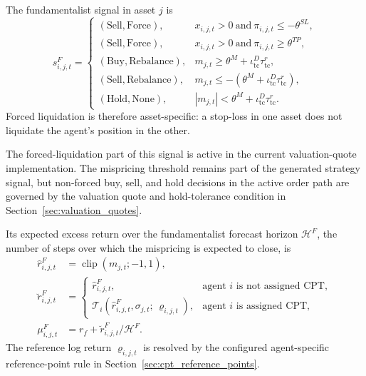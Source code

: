 \documentclass[12pt, a4paper]{article}
\DeclareMathOperator{\clip}{clip}
\begin{document}
    The fundamentalist signal in asset \(j\) is
    \[
        s_{i,j,t}^{F}=
        \begin{cases}
            (\mathrm{Sell},\mathrm{Force}), & x_{i,j,t}>0\ \text{and}\ \pi_{i,j,t}\le -\theta^{SL},\\
        (\mathrm{Sell},\mathrm{Force}), & x_{i,j,t}>0\ \text{and}\ \pi_{i,j,t}\ge \theta^{TP},\\
        (\mathrm{Buy},\mathrm{Rebalance}), & m_{j,t}\ge \theta^{M}+\iota_{\mathrm{tc}}^D\tau_{\mathrm{tc}}^{r},\\
        (\mathrm{Sell},\mathrm{Rebalance}), & m_{j,t}\le -\left(\theta^{M}+\iota_{\mathrm{tc}}^D\tau_{\mathrm{tc}}^{r}\right),\\
        (\mathrm{Hold},\mathrm{None}), & |m_{j,t}|<\theta^{M}+\iota_{\mathrm{tc}}^D\tau_{\mathrm{tc}}^{r}.
        \end{cases}
    \]
    Forced liquidation is therefore asset-specific: a stop-loss in one asset does
    not liquidate the agent's position in the other.

    The forced-liquidation part of this signal is active in the current
    valuation-quote implementation. The mispricing threshold remains part of the
    generated strategy signal, but non-forced buy, sell, and hold decisions in the
    active order path are governed by the valuation quote and hold-tolerance
    condition in Section~\ref{sec:valuation_quotes}.

    Its expected excess return over the fundamentalist forecast horizon
    \(\mathcal H^F\), the number of steps over which the mispricing is expected
    to close, is
    \begin{align*}
        \hat r_{i,j,t}^{F}&=\clip(m_{j,t};-1,1),\\
        \breve r_{i,j,t}^{F}&=
        \begin{cases}
            \hat r_{i,j,t}^{F}, & \text{agent } i \text{ is not assigned CPT},\\
            \mathcal{T}_i\!\left(\hat r_{i,j,t}^{F},\sigma_{j,t};\,\varrho_{i,j,t}\right), & \text{agent } i \text{ is assigned CPT},
        \end{cases}
        \\
        \mu_{i,j,t}^{F}&=r_f+\breve r_{i,j,t}^{F}/\mathcal H^{F}.
    \end{align*}
    The reference log return \(\varrho_{i,j,t}\) is resolved by the configured
    agent-specific reference-point rule in Section~\ref{sec:cpt_reference_points}.
\end{document}
